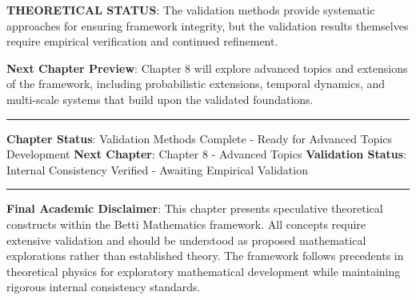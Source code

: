 \textbf{THEORETICAL STATUS}: The validation methods provide systematic approaches for ensuring framework integrity, but the validation results themselves require empirical verification and continued refinement.

\textbf{Next Chapter Preview}: Chapter 8 will explore advanced topics and extensions of the framework, including probabilistic extensions, temporal dynamics, and multi-scale systems that build upon the validated foundations.

\hrule

\textbf{Chapter Status}: Validation Methods Complete - Ready for Advanced Topics Development  
\textbf{Next Chapter}: Chapter 8 - Advanced Topics  
\textbf{Validation Status}: Internal Consistency Verified - Awaiting Empirical Validation

\hrule

\textbf{Final Academic Disclaimer}: This chapter presents speculative theoretical constructs within the Betti Mathematics framework. All concepts require extensive validation and should be understood as proposed mathematical explorations rather than established theory. The framework follows precedents in theoretical physics for exploratory mathematical development while maintaining rigorous internal consistency standards.